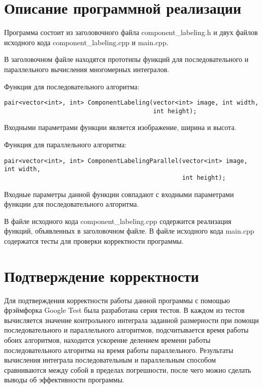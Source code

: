 \documentclass{report}
\begin{document}
\section*{Описание программной реализации}
Программа состоит из заголовочного файла component\_labeling.h и двух файлов исходного кода component\_labeling.cpp и main.cpp.
\par В заголовочном файле находятся прототипы функций для последовательного и параллельного вычисления многомерных интегралов.
\par Функция для последовательного алгоритма:
\begin{lstlisting}
pair<vector<int>, int> ComponentLabeling(vector<int> image, int width,
                                         int height);
\end{lstlisting}
Входными параметрами функции является изображение, ширина и высота.
\par Функция для параллельного
алгоритма:
\begin{lstlisting}
pair<vector<int>, int> ComponentLabelingParallel(vector<int> image, int width,
                                                 int height);
\end{lstlisting}
Входные параметры данной функции совпадают с входными параметрами функции для последовательного алгоритма.
\par В файле исходного кода component\_labeling.cpp содержится реализация функций, объявленных в заголовочном файле. В файле исходного кода main.cpp содержатся тесты для проверки корректности программы.
\newpage

\section*{Подтверждение корректности}
Для подтверждения корректности работы данной программы с помощью фрэймфорка Google Test была разработана серия тестов. В каждом из тестов вычисляется значение контрольного  интеграла заданной размерности при помощи последовательного и параллельного алгоритмов, подсчитывается время работы обоих алгоритмов, находится ускорение делением времени работы последовательного алгоритма на время работы параллельного. Результаты вычисления интеграла последовательным и параллельным способом сравниваются между собой в пределах погрешности, после чего можно сделать выводы об эффективности программы.
\end{document}
